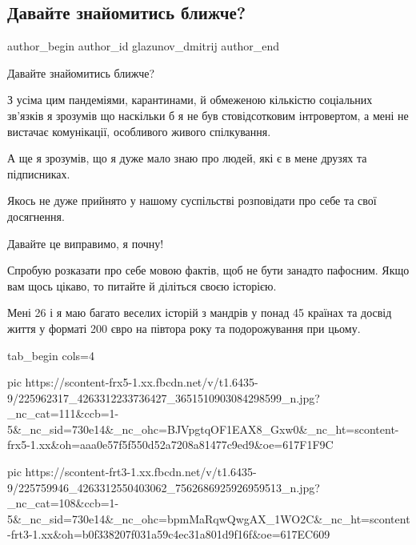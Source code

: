  
 
 
 
 
 
\subsection{Давайте знайомитись ближче?}
\label{sec:29_07_2021.fb.glazunov_dmitrij.1.znakomitsja_blizhe}
 
\ifcmt
 author_begin
   author_id glazunov_dmitrij
 author_end
\fi

Давайте знайомитись ближче?

З усіма цим пандеміями, карантинами, й обмеженою кількістю соціальних зв’язків
я зрозумів що наскільки б я не був стовідсотковим інтровертом, а мені не
вистачає комунікації, особливого живого спілкування.

А ще я зрозумів, що я дуже мало знаю про людей, які є в мене друзях та
підписниках.

Якось не дуже прийнято у нашому суспільстві розповідати про себе та свої
досягнення.

Давайте це виправимо, я почну!

Спробую розказати про себе мовою фактів, щоб не бути занадто пафосним. Якщо вам
щось цікаво, то питайте й діліться своєю історією.

Мені 26 і я маю багато веселих історій з мандрів у понад 45 країнах та досвід
життя у форматі 200 євро на півтора року та подорожування при цьому.

\ifcmt
  tab_begin cols=4

     pic https://scontent-frx5-1.xx.fbcdn.net/v/t1.6435-9/225962317_4263312233736427_3651510903084298599_n.jpg?_nc_cat=111&ccb=1-5&_nc_sid=730e14&_nc_ohc=BJVpgtqOF1EAX8_Gxw0&_nc_ht=scontent-frx5-1.xx&oh=aaa0e57f5f550d52a7208a81477c9ed9&oe=617F1F9C

     pic https://scontent-frt3-1.xx.fbcdn.net/v/t1.6435-9/225759946_4263312550403062_7562686925926959513_n.jpg?_nc_cat=108&ccb=1-5&_nc_sid=730e14&_nc_ohc=bpmMaRqwQwgAX_1WO2C&_nc_ht=scontent-frt3-1.xx&oh=b0f338207f031a59c4ec31a801d9f16f&oe=617EC609

